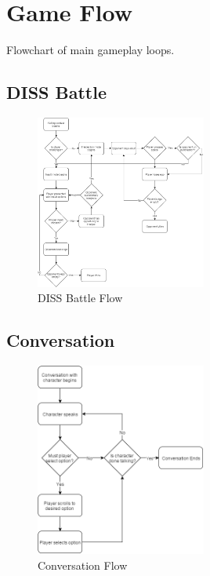 \section{Game Flow}
Flowchart of main gameplay loops.

\subsection{DISS Battle}
\begin{figure}[H]
\centering\includegraphics[width=0.5\textwidth, height=0.8\paperheight, keepaspectratio=true]{images/YellingContest}
  \caption{DISS Battle Flow}
  \label{fig:flow_yelling_contest}
\end{figure}

\subsection{Conversation}
\begin{figure}[H]
\centering\includegraphics[width=0.5\textwidth, height=0.8\paperheight, keepaspectratio=true]{images/Conversation}
  \caption{Conversation Flow}
  \label{fig:flow_conversation}
\end{figure}

